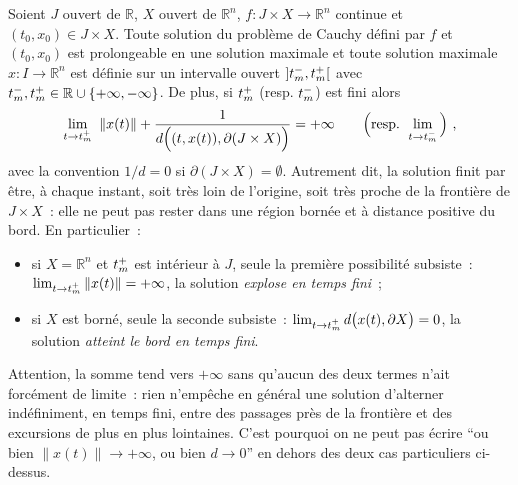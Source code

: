 \hypertarget{theo_bouts}{}
\begin{theoreme}\label{theo_bouts}
Soient \(J\) ouvert de \(\mathbb{R}\), \(X\) ouvert de
\(\mathbb{R}^{n}\), \(f: J\times X \to \mathbb{R}^n\) continue et
\((t_0,x_0)\in J\times X\). Toute solution du problème de Cauchy défini
par \(f\) et \((t_0,x_0)\) est prolongeable en une solution maximale et
toute solution maximale \(x:I\to \mathbb{R}^n\) est définie sur un
intervalle ouvert \(\left]t_m^-,t_m^+\right[\) avec
\(t_m^-,t_m^+\in \mathbb{R}\cup\{+\infty,-\infty\}\). De plus, si
\(t_m^+\) (resp. \(t_m^-\)) est fini alors \[
\lim_{t\to t_m^+} \ \|x(t)\| + \frac{1}{d\Big((t,x(t)),\partial (J\times X) \Big)} = +\infty
\qquad \Big(\text{resp. } \lim_{t\to t_m^-}\Big) \ ,
\] avec la convention \(1/d = 0\) si \(\partial (J\times X)=\emptyset\).
Autrement dit, la solution finit par être, à chaque instant, soit très
loin de l'origine, soit très proche de la frontière de \(J\times X\)~:
elle ne peut pas rester dans une région bornée et à distance positive du
bord. En particulier~:

\begin{itemize}
\item
  si \(X=\mathbb{R}^n\) et \(t_m^+\) est intérieur à \(J\), seule la
  première possibilité subsiste~: \(\lim_{t\to t_m^+}\|x(t)\| = +\infty\),
  la solution \emph{explose en temps fini}~;
\item
  si \(X\) est borné, seule la seconde subsiste~:
  \(\lim_{t\to t_m^+} d\big(x(t),\partial X\big) = 0\), la solution
  \emph{atteint le bord en temps fini}.
\end{itemize}
\end{theoreme}

\begin{remarque}
Attention, la somme tend vers \(+\infty\) sans qu'aucun des deux termes
n'ait forcément de limite~: rien n'empêche en général une solution
d'alterner indéfiniment, en temps fini, entre des passages près de la
frontière et des excursions de plus en plus lointaines. C'est pourquoi on
ne peut pas écrire ``ou bien \(\|x(t)\|\to+\infty\), ou bien \(d\to 0\)''
en dehors des deux cas particuliers ci-dessus.
\end{remarque}

